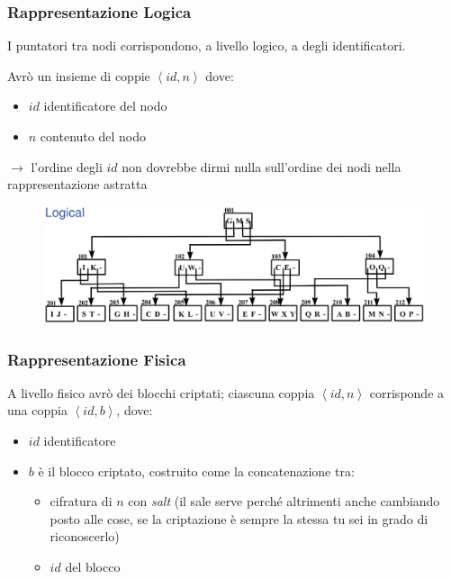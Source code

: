 \documentclass{report}
\begin{document}
\subsubsection{Rappresentazione Logica}
I puntatori tra nodi corrispondono, a livello logico, a degli identificatori.

\noindent Avrò un insieme di coppie $\left\langle id, n \right\rangle$ dove:
\begin{itemize}
    \item $id$ identificatore del nodo 
    \item $n$ contenuto del nodo
\end{itemize}

$\rightarrow$ l'ordine degli $id$ non dovrebbe dirmi nulla sull'ordine dei nodi  
nella rappresentazione astratta 

\begin{figure}[ht]
    \centering
    \includegraphics[width=1\linewidth]{images/b+-tree-logical.png}
\end{figure}

\subsubsection{Rappresentazione Fisica}
A livello fisico avrò dei blocchi criptati; ciascuna coppia $\left\langle id, n \right\rangle$ 
corrisponde a una coppia $\left\langle id, b \right\rangle$, dove:
\begin{itemize}
    \item $id$ identificatore 
    \item $b$ è il blocco criptato, costruito come la concatenazione tra:
    \begin{itemize}
        \item cifratura di $n$ con \textit{salt} (il sale serve perché altrimenti anche cambiando posto alle cose, se la criptazione è sempre la stessa tu sei in grado di riconoscerlo)
        \item $id$ del blocco
    \end{itemize}
\end{itemize}
\end{document}
